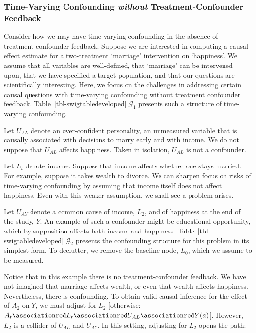 \documentclass[
  single column]{article}
\begin{document}
\subsubsection{\texorpdfstring{Time-Varying Confounding \emph{without}
Treatment-Confounder
Feedback}{Time-Varying Confounding without Treatment-Confounder Feedback}}\label{time-varying-confounding-without-treatment-confounder-feedback}

Consider how we may have time-varying confounding in the absence of
treatment-confounder feedback. Suppose we are interested in computing a
causal effect estimate for a two-treatment `marriage' intervention on
`happiness'. We assume that all variables are well-defined, that
`marriage' can be intervened upon, that we have specified a target
population, and that our questions are scientifically interesting. Here,
we focus on the challenges in addressing certain causal questions with
time-varying confounding without treatment confounder feedback.
Table~\ref{tbl-swigtabledeveloped} \(\mathcal{G}_1\) presents such a
structure of time-varying confounding.

Let \(U_{AL}\) denote an over-confident personality, an unmeasured
variable that is causally associated with decisions to marry early and
with income. We do not suppose that \(U_{AL}\) affects happiness. Taken
in isolation, \(U_{AL}\) is not a confounder.

Let \(L_t\) denote income. Suppose that income affects whether one stays
married. For example, suppose it takes wealth to divorce. We can sharpen
focus on risks of time-varying confounding by assuming that income
itself does not affect happiness. Even with this weaker assumption, we
shall see a problem arises.

Let \(U_{AY}\) denote a common cause of income, \(L_2\), and of
happiness at the end of the study, \(Y\). An example of such a
confounder might be educational opportunity, which by supposition
affects both income and happiness. Table~\ref{tbl-swigtabledeveloped}
\(\mathcal{G}_2\) presents the confounding structure for this problem in
its simplest form. To declutter, we remove the baseline node, \(L_0\),
which we assume to be measured.

Notice that in this example there is no treatment-confounder feedback.
We have not imagined that marriage affects wealth, or even that wealth
affects happiness. Nevertheless, there is confounding. To obtain valid
causal inference for the effect of \(A_2\) on \(Y\), we must adjust for
\(L_2\) {[}otherwise:
\(A_t\associationred L_t \associationred U_{AL}\associationred Y(a)\){]}.
However, \(L_2\) is a collider of \(U_{AL}\) and \(U_{AY}\). In this
setting, adjusting for \(L_2\) opens the path:
\end{document}
